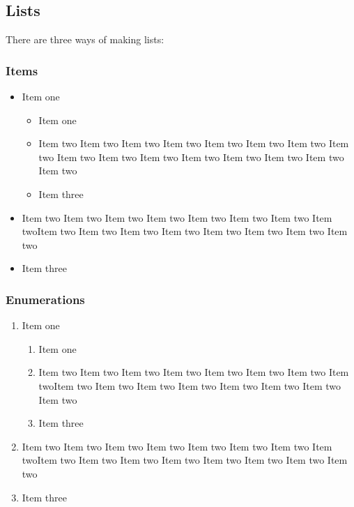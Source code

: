 \documentclass[numbered]{ivt-style/standard}\usepackage[]{graphicx}\usepackage[]{xcolor}
\begin{document}
\subsection{Lists}

There are three ways of making lists:

\subsubsection{Items}

\begin{itemize}
  \item Item one
  \begin{itemize}
    \item Item one
    \item Item two Item two Item two Item two Item two Item two Item
    two Item two
    Item two Item two Item two Item two Item two Item two Item
    two Item two
    \item Item three
  \end{itemize}
  \item Item two Item two Item two Item two Item two Item two Item two
Item twoItem two Item two Item two Item two Item two Item two Item two
Item two
  \item Item three
\end{itemize}

\subsubsection{Enumerations}

\begin{enumerate}
  \item Item one
  \begin{enumerate}
    \item Item one
    \item Item two Item two Item two Item two Item two Item two Item
two Item twoItem two Item two Item two Item two Item two Item two Item
two Item two
    \item Item three
  \end{enumerate}
  \item Item two Item two Item two Item two Item two Item two Item two
Item twoItem two Item two Item two Item two Item two Item two Item two
Item two
  \item Item three
\end{enumerate}
\end{document}
